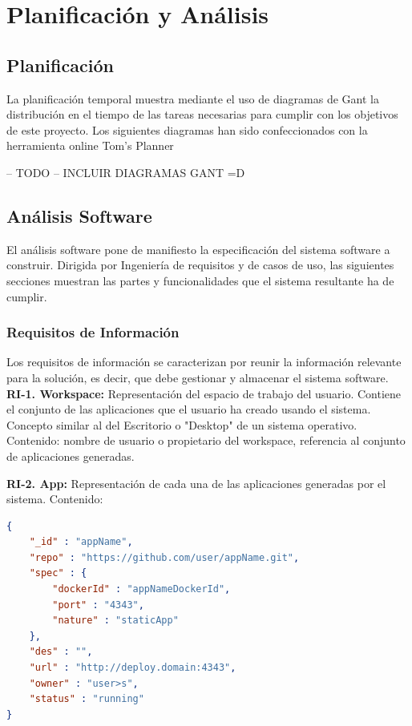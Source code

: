 \documentclass[a4paper,11pt]{book}
\begin{document}
\chapter{Planificación y Análisis}

\section{Planificación}

La planificación temporal muestra mediante el uso de diagramas de Gant la distribución en el tiempo de las tareas necesarias para cumplir con los objetivos de este proyecto. Los siguientes diagramas han sido confeccionados con la herramienta online Tom's Planner\cite{tom}

--  TODO -- INCLUIR DIAGRAMAS GANT =D


\section{Análisis Software}

El análisis software pone de manifiesto la especificación del sistema software a construir. Dirigida por Ingeniería de requisitos y de casos de uso, las siguientes secciones muestran las partes y funcionalidades que el sistema resultante ha de cumplir.

\subsection{Requisitos de Información }
Los requisitos de información se caracterizan por reunir la información relevante para la solución, es decir, que debe gestionar y almacenar el sistema software.\\

\textbf{RI-1. Workspace:} Representación del espacio de trabajo del usuario. Contiene el conjunto de las aplicaciones que el usuario ha creado usando el sistema. Concepto similar al del Escritorio o "Desktop" de un sistema operativo.
Contenido: nombre de usuario o propietario del workspace, referencia al conjunto de aplicaciones generadas.


\textbf{RI-2. App:} Representación de cada una de las aplicaciones generadas por el sistema.
Contenido:
\begin{lstlisting}[language=json,firstnumber=1]
{
    "_id" : "appName",
    "repo" : "https://github.com/user/appName.git",
    "spec" : {
        "dockerId" : "appNameDockerId",
        "port" : "4343",
        "nature" : "staticApp"
    },
    "des" : "",
    "url" : "http://deploy.domain:4343",
    "owner" : "user>s",
    "status" : "running"
}
\end{lstlisting}
\end{document}
